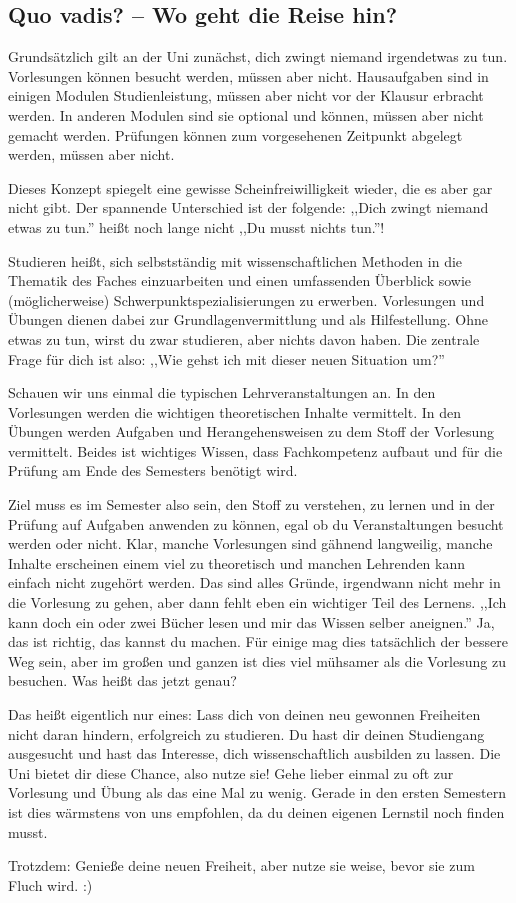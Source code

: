 \subsection{Quo vadis? -- Wo geht die Reise hin?}

Grundsätzlich gilt an der Uni zunächst, dich zwingt niemand irgendetwas zu tun. Vorlesungen können besucht werden, müssen aber nicht. Hausaufgaben sind in einigen Modulen Studienleistung, müssen aber nicht vor der Klausur erbracht werden. In anderen Modulen sind sie optional und können, müssen aber nicht gemacht werden. Prüfungen können zum vorgesehenen Zeitpunkt abgelegt werden, müssen aber nicht.

Dieses Konzept spiegelt eine gewisse Scheinfreiwilligkeit wieder, die es aber gar nicht gibt. Der spannende Unterschied ist der folgende: ,,Dich zwingt niemand etwas zu tun.'' heißt noch lange nicht ,,Du musst nichts tun.''! 

Studieren heißt, sich selbstständig mit wissenschaftlichen Methoden in die Thematik des Faches einzuarbeiten und einen umfassenden Überblick sowie (möglicherweise) Schwerpunktspezialisierungen zu erwerben. Vorlesungen und Übungen dienen dabei zur Grundlagenvermittlung und als Hilfestellung. Ohne etwas zu tun, wirst du zwar studieren, aber nichts davon haben. Die zentrale Frage für dich ist also: ,,Wie gehst ich mit dieser neuen Situation um?''

Schauen wir uns einmal die typischen Lehrveranstaltungen an. In den Vorlesungen werden die wichtigen theoretischen Inhalte vermittelt. In den Übungen werden Aufgaben und Herangehensweisen zu dem Stoff der Vorlesung vermittelt. Beides ist wichtiges Wissen, dass Fachkompetenz aufbaut und für die Prüfung am Ende des Semesters benötigt wird.

Ziel muss es im Semester also sein, den Stoff zu verstehen, zu lernen und in der Prüfung auf Aufgaben anwenden zu können, egal ob du Veranstaltungen besucht werden oder nicht. Klar, manche Vorlesungen sind gähnend langweilig, manche Inhalte erscheinen einem viel zu theoretisch und manchen Lehrenden kann einfach nicht zugehört werden. Das sind alles Gründe, irgendwann nicht mehr in die Vorlesung zu gehen, aber dann fehlt eben ein wichtiger Teil des Lernens. ,,Ich kann doch ein oder zwei Bücher lesen und mir das Wissen selber aneignen.'' Ja, das ist richtig, das kannst du machen. Für einige mag dies tatsächlich der bessere Weg sein, aber im großen und ganzen ist dies viel mühsamer als die Vorlesung zu besuchen. Was heißt das jetzt genau? 

Das heißt eigentlich nur eines: Lass dich von deinen neu gewonnen Freiheiten nicht daran hindern, erfolgreich zu studieren. Du hast dir deinen Studiengang ausgesucht und hast das Interesse, dich wissenschaftlich ausbilden zu lassen. Die Uni bietet dir diese Chance, also nutze sie! Gehe lieber einmal zu oft zur Vorlesung und Übung als das eine Mal zu wenig. Gerade in den ersten Semestern ist dies wärmstens von uns empfohlen, da du deinen eigenen Lernstil noch finden musst.

Trotzdem: Genieße deine neuen Freiheit, aber nutze sie weise, bevor sie zum Fluch wird. :)
